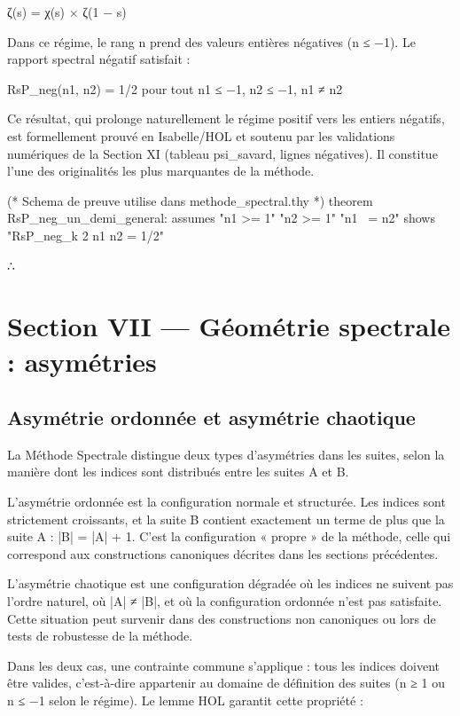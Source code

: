 \documentclass[11pt,a4paper]{article}
\begin{document}
ζ(s) = χ(s) × ζ(1 − s)

Dans ce régime, le rang n prend des valeurs entières négatives (n ≤ −1). Le rapport spectral négatif satisfait :

RsP\_neg(n1, n2) = 1/2 pour tout n1 ≤ −1, n2 ≤ −1, n1 ≠ n2

Ce résultat, qui prolonge naturellement le régime positif vers les entiers négatifs, est formellement prouvé en Isabelle/HOL et soutenu par les validations numériques de la Section XI (tableau psi\_savard, lignes négatives). Il constitue l'une des originalités les plus marquantes de la méthode.

\begin{holcode}[title={Code HOL — Invariance RsP en régime négatif}]
(* Schema de preuve utilise dans methode_spectral.thy *)
theorem RsP_neg_un_demi_general:
 assumes "n1 >= 1" "n2 >= 1" "n1 ~= n2"
 shows "RsP_neg_k 2 n1 n2 = 1/2"
\end{holcode}

∴

\section{Section VII — Géométrie spectrale : asymétries}
\subsection{Asymétrie ordonnée et asymétrie chaotique}

La Méthode Spectrale distingue deux types d'asymétries dans les suites, selon la manière dont les indices sont distribués entre les suites A et B.

L'asymétrie ordonnée est la configuration normale et structurée. Les indices sont strictement croissants, et la suite B contient exactement un terme de plus que la suite A : |B| = |A| + 1. C'est la configuration « propre » de la méthode, celle qui correspond aux constructions canoniques décrites dans les sections précédentes.

L'asymétrie chaotique est une configuration dégradée où les indices ne suivent pas l'ordre naturel, où |A| ≠ |B|, et où la configuration ordonnée n'est pas satisfaite. Cette situation peut survenir dans des constructions non canoniques ou lors de tests de robustesse de la méthode.

Dans les deux cas, une contrainte commune s'applique : tous les indices doivent être valides, c'est-à-dire appartenir au domaine de définition des suites (n ≥ 1 ou n ≤ −1 selon le régime). Le lemme HOL garantit cette propriété :
\end{document}
